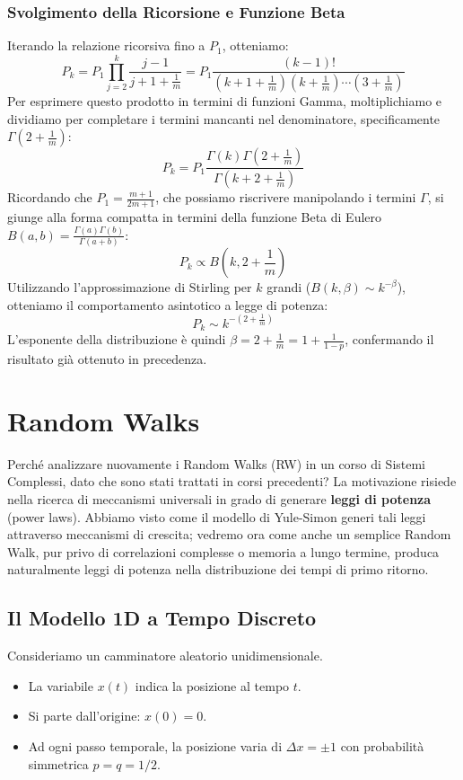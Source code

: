 \subsubsection{Svolgimento della Ricorsione e Funzione Beta}
Iterando la relazione ricorsiva fino a $P_1$, otteniamo:
\begin{equation}
    P_k = P_1 \prod_{j=2}^{k} \frac{j-1}{j + 1 + \frac{1}{m}} = P_1 \frac{(k-1)!}{(k+1+\frac{1}{m})(k+\frac{1}{m})\cdots(3+\frac{1}{m})}
\end{equation}
Per esprimere questo prodotto in termini di funzioni Gamma, moltiplichiamo e dividiamo per completare i termini mancanti nel denominatore, specificamente $\Gamma(2 + \frac{1}{m})$:
\begin{equation}
    P_k = P_1 \frac{\Gamma(k) \Gamma(2+\frac{1}{m})}{\Gamma(k + 2 + \frac{1}{m})}
\end{equation}
Ricordando che $P_1 = \frac{m+1}{2m+1}$, che possiamo riscrivere manipolando i termini $\Gamma$, si giunge alla forma compatta in termini della funzione Beta di Eulero $B(a,b) = \frac{\Gamma(a)\Gamma(b)}{\Gamma(a+b)}$:
\begin{equation}
    P_k \propto B\left(k, 2 + \frac{1}{m}\right)
\end{equation}
Utilizzando l'approssimazione di Stirling per $k$ grandi ($B(k, \beta) \sim k^{-\beta}$), otteniamo il comportamento asintotico a legge di potenza:
\begin{equation}
    P_k \sim k^{-\left(2 + \frac{1}{m}\right)}
\end{equation}
L'esponente della distribuzione è quindi $\beta = 2 + \frac{1}{m} = 1 + \frac{1}{1-p}$, confermando il risultato già ottenuto in precedenza.

\section{Random Walks}

Perché analizzare nuovamente i Random Walks (RW) in un corso di Sistemi Complessi, dato che sono stati trattati in corsi precedenti? La motivazione risiede nella ricerca di meccanismi universali in grado di generare \textbf{leggi di potenza} (power laws). Abbiamo visto come il modello di Yule-Simon generi tali leggi attraverso meccanismi di crescita; vedremo ora come anche un semplice Random Walk, pur privo di correlazioni complesse o memoria a lungo termine, produca naturalmente leggi di potenza nella distribuzione dei tempi di primo ritorno.

\subsection{Il Modello 1D a Tempo Discreto}
Consideriamo un camminatore aleatorio unidimensionale.
\begin{itemize}
    \item La variabile $x(t)$ indica la posizione al tempo $t$.
    \item Si parte dall'origine: $x(0) = 0$.
    \item Ad ogni passo temporale, la posizione varia di $\Delta x = \pm 1$ con probabilità simmetrica $p = q = 1/2$.
\end{itemize}

